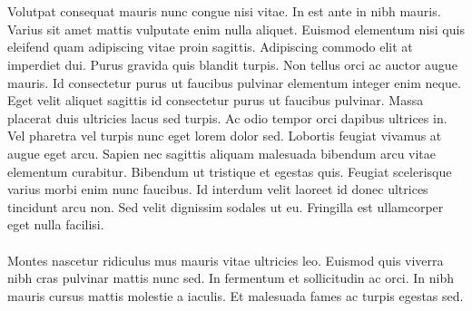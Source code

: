 \\\\
Volutpat consequat mauris nunc congue nisi vitae. In est ante in nibh mauris. Varius sit amet mattis vulputate enim nulla aliquet. Euismod elementum nisi quis eleifend quam adipiscing vitae proin sagittis. Adipiscing commodo elit at imperdiet dui. Purus gravida quis blandit turpis. Non tellus orci ac auctor augue mauris. Id consectetur purus ut faucibus pulvinar elementum integer enim neque. Eget velit aliquet sagittis id consectetur purus ut faucibus pulvinar. Massa placerat duis ultricies lacus sed turpis. Ac odio tempor orci dapibus ultrices in. Vel pharetra vel turpis nunc eget lorem dolor sed. Lobortis feugiat vivamus at augue eget arcu. Sapien nec sagittis aliquam malesuada bibendum arcu vitae elementum curabitur. Bibendum ut tristique et egestas quis. Feugiat scelerisque varius morbi enim nunc faucibus. Id interdum velit laoreet id donec ultrices tincidunt arcu non. Sed velit dignissim sodales ut eu. Fringilla est ullamcorper eget nulla facilisi.
\\\\
Montes nascetur ridiculus mus mauris vitae ultricies leo. Euismod quis viverra nibh cras pulvinar mattis nunc sed. In fermentum et sollicitudin ac orci. In nibh mauris cursus mattis molestie a iaculis. Et malesuada fames ac turpis egestas sed. 